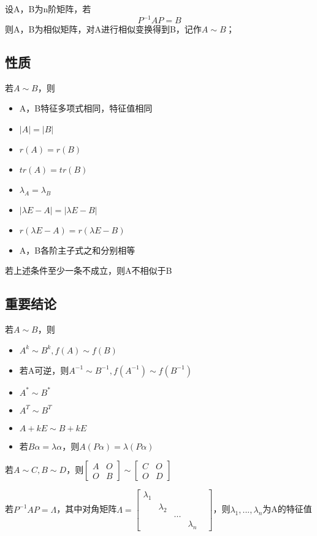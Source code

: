 设A，B为n阶矩阵，若
\[P^{-1}AP = B\]
则A，B为相似矩阵，对A进行相似变换得到B，记作\(A \sim B\)；

\subsection{性质}
若\(A \sim B\)，则
\begin{itemize}
    \item A，B特征多项式相同，特征值相同
    \item \(|A| = |B|\)
    \item \(r(A) = r(B)\)
    \item \(tr(A) = tr(B)\)
    \item \(\lambda_A = \lambda_B\)
    \item \(|\lambda E - A| = |\lambda E - B|\)
    \item \(r(\lambda E - A) = r(\lambda E - B)\)
    \item A，B各阶主子式之和分别相等
\end{itemize}
若上述条件至少一条不成立，则A不相似于B

\subsection{重要结论}
若\(A \sim B\)，则
\begin{itemize}
    \item \(A^k \sim B^k, f(A) \sim f(B)\)
    \item 若A可逆，则\(A^{-1} \sim B^{-1}, f(A^{-1}) \sim f(B^{-1})\)
    \item \(A^* \sim B^*\)
    \item \(A^T \sim B^T\)
    \item \(A + kE \sim B + kE\)
    \item 若\(B\alpha = \lambda\alpha\)，则\(A(P\alpha) = \lambda(P\alpha)\)
\end{itemize}

若\(A \sim C, B \sim D\)，则\(\begin{bmatrix}
    A & O \\ 
    O & B
\end{bmatrix} \sim \begin{bmatrix}
    C & O \\ 
    O & D
\end{bmatrix}\)

若\(P^{-1}AP = \Lambda\)，其中对角矩阵\(\Lambda = \begin{bmatrix}
\lambda_1 & & & & \\ 
& \lambda_2 & \\ 
& & ... \\ 
& & & \lambda_n
\end{bmatrix}\)，则\(\lambda_1, ..., \lambda_n\)为A的特征值

